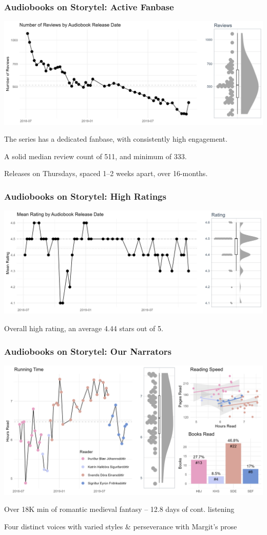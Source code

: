 \begin{frame}
    \frametitle{Audiobooks on Storytel: Active Fanbase}
    \includegraphics[width=\textwidth]{../R/figures/storytel_reviews}

    The series has a dedicated fanbase, with consistently high engagement.

    A solid median review count of 511, and minimum of 333.

    Releases on Thursdays, spaced 1--2 weeks apart, over 16-months.

\end{frame}

\begin{frame}
    \frametitle{Audiobooks on Storytel: High Ratings}
    \includegraphics[width=\textwidth]{../R/figures/storytel_ratings}

    Overall high rating, an average 4.44 stars out of 5.

\end{frame}

\begin{frame}
    \frametitle{Audiobooks on Storytel: Our Narrators}
    \includegraphics[width=\textwidth]{../R/figures/storytel_readers}
    \vspace{-18pt}

    Over 18K min of romantic medieval fantasy -- 12.8 days of cont. listening

    Four distinct voices with varied styles \& perseverance with Margit's prose

\end{frame}
